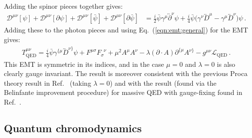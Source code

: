 \documentclass[prd,preprint,
  showpacs,showkeys,lengthcheck,
  nofootinbib,tightenlines,onecolumn,notitlepage,
  preprintnumbers,superscriptaddress]{revtex4-1}
\newcommand{\Lag}{\ensuremath{\mathscr{L}}}
\begin{document}
Adding the spinor pieces together gives:
\begin{align}
  \mathscr{D}^{\mu\nu}[ \psi ]
  +
  \mathscr{D}^{\mu\nu}[ \partial\psi ]
  +
  \mathscr{D}^{\mu\nu}[ \bar\psi ]
  +
  \mathscr{D}^{\mu\nu}[ \partial\bar\psi ]
  &=
  \frac{i}{2} \bar\psi
  \gamma^\mu \overleftrightarrow{\partial}^\nu
  \psi
  +
  \frac{i}{4}
  \bar\psi
  \Big(
  \gamma^\nu \overleftrightarrow{D}^\mu
  -
  \gamma^\mu \overleftrightarrow{D}^\nu
  \Big)
  \psi
  \,.
\end{align}
Adding these to the photon pieces and using
Eq.~(\ref{eqn:emt:general}) for the EMT gives:
\begin{align}
  \label{eqn:emt:qed}
  T^{\mu\nu}_{\mathrm{QED}}
  =
  \frac{i}{4} \bar\psi
  \gamma^{\{\mu} \overleftrightarrow{D}^{\nu\}}
  \psi
  + F^{\mu\sigma} F_{\sigma}^{\phantom{\sigma}\nu}
  + \mu^2 A^\mu A^\nu
  - \lambda (\partial\cdot A) \partial^{\{\mu} A^{\nu\}}
  -
  g^{\mu\nu} \Lag_{\mathrm{QED}}
  \,.
\end{align}
This EMT is symmetric in its indices,
and in the case $\mu=0$ and $\lambda=0$
is also clearly gauge invariant.
The result is moreover consistent with the previous
Proca theory result in Ref.~\cite{Montesinos:2006th} (taking $\lambda=0$)
and with the result (found via the Belinfante improvement procedure)
for massive QED with gauge-fixing found in Ref.~\cite{Embacher:1986pt}.


\subsection{Quantum chromodynamics}
\end{document}
